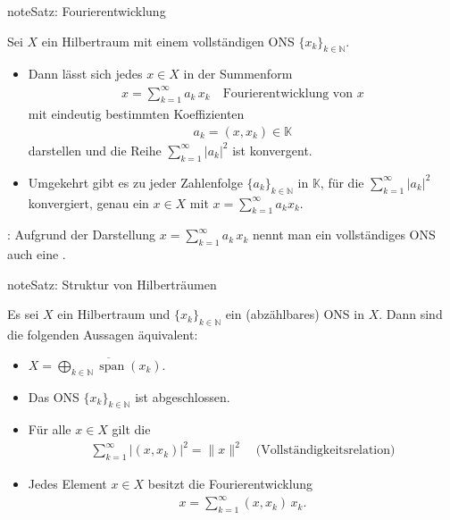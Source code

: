 \documentclass[letterpaper,10pt,english]{jupyterBook}
\begin{document}
\begin{sphinxadmonition}{note}{Satz: Fourierentwicklung}

Sei \(X\) ein Hilbertraum mit einem vollständigen ONS \(\{x_k\}_{k\in\mathbb{N}}\).
\begin{itemize}
\item {} 
Dann lässt sich jedes \(x\in X\) in der Summenform
\begin{equation*}
\begin{split}x = \sum_{k=1}^\infty a_k\,x_k\quad\text{Fourierentwicklung von $x$}\end{split}
\end{equation*}
mit eindeutig bestimmten Koeffizienten
\begin{equation*}
\begin{split}a_k = (x,x_k)\in\mathbb{K}\end{split}
\end{equation*}
darstellen und die Reihe \(\sum_{k=1}^\infty |a_k|^2\) ist konvergent.

\item {} 
Umgekehrt gibt es zu jeder Zahlenfolge \(\{a_k\}_{k\in\mathbb{N}}\) in \(\mathbb{K}\), für die \(\sum_{k=1}^\infty |a_k|^2\) konvergiert, genau ein \(x\in X\) mit \(x=\sum_{k=1}^\infty a_k x_k\).

\end{itemize}
\end{sphinxadmonition}

: Aufgrund der Darstellung \(x = \sum_{k=1}^\infty a_k\,x_k\) nennt man ein vollständiges ONS auch eine .

\begin{sphinxadmonition}{note}{Satz: Struktur von Hilberträumen}

Es sei \(X\) ein Hilbertraum und \(\{x_k\}_{k\in\mathbb{N}}\) ein (abzählbares) ONS in \(X\). Dann sind die folgenden Aussagen äquivalent:
\begin{itemize}
\item {} 
\(X = \overline{\underset{k\in\mathbb{N}}{\bigoplus} \mathop{span}(x_k)}\).

\item {} 
Das ONS \(\{x_k\}_{k\in\mathbb{N}}\) ist abgeschlossen.

\item {} 
Für alle \(x\in X\) gilt die 
\begin{equation*}
\begin{split}\sum_{k=1}^\infty |(x,x_k)|^2 = \|x\|^2\quad\text{(Vollständigkeitsrelation)}\end{split}
\end{equation*}
\item {} 
Jedes Element \(x\in X\) besitzt die Fourierentwicklung
\begin{equation*}
\begin{split}x = \sum_{k=1}^\infty (x,x_k)\,x_k.\end{split}
\end{equation*}
\end{itemize}
\end{sphinxadmonition}
\end{document}
